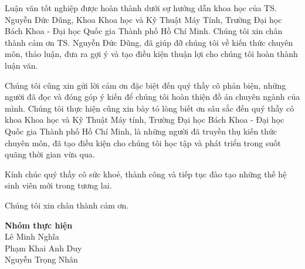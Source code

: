 \begin{acknowledgments}

    Luận văn tốt nghiệp được hoàn thành dưới sự hướng dẫn khoa học của TS. Nguyễn Đức Dũng, Khoa Khoa học và Kỹ Thuật Máy Tính, Trường Đại học Bách Khoa - Đại học Quốc gia Thành phố Hồ Chí Minh. Chúng tôi xin chân thành cảm ơn TS. Nguyễn Đức Dũng, đã giúp đỡ chúng tôi về kiến thức chuyên môn, thảo luận, đưa ra gợi ý và tạo điều kiện thuận lợi cho chúng tôi hoàn thành luận văn.

    Chúng tôi cũng xin gửi lời cảm ơn đặc biệt đến quý thầy cô phản biện, những người đã đọc và đóng góp ý kiến để chúng tôi hoàn thiện đồ án chuyên ngành của mình. Chúng tôi thực hiện cũng xin bày tỏ lòng biết ơn sâu sắc đến quý thầy cô khoa Khoa học và Kỹ Thuật Máy tính, Trường Đại học Bách Khoa - Đại học Quốc gia Thành phố Hồ Chí Minh, là những người đã truyền thụ kiến thức chuyên môn, đã tạo điều kiện cho chúng tôi học tập và phát triển trong suốt quãng thời gian vừa qua.

    Kính chúc quý thầy cô sức khoẻ, thành công và tiếp tục đào tạo những thế hệ sinh viên mới trong tương lai.

    Chúng tôi xin chân thành cảm ơn.

    \begin{flushright}
        \textbf{Nhóm thực hiện} \\
        Lê Minh Nghĩa \\
        Phạm Khai Anh Duy \\
        Nguyễn Trọng Nhân \\
    \end{flushright}

\end{acknowledgments}